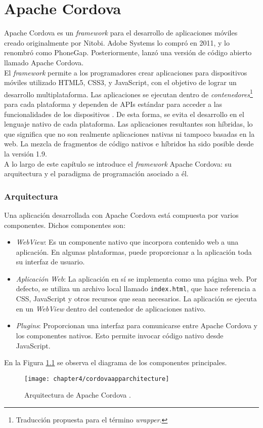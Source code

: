 \chapter{Apache Cordova}
Apache Cordova es un \emph{framework} para el desarrollo de aplicaciones móviles creado originalmente por Nitobi. Adobe Systems lo compró en 2011, y lo renombró como PhoneGap. Posteriormente, lanzó una versión de código abierto llamado Apache Cordova.\\

El \emph{framework} permite a los programadores crear aplicaciones para dispositivos móviles utilizado HTML5, CSS3, y JavaScript, con el objetivo de lograr un desarrollo multiplataforma. Las aplicaciones se ejecutan dentro de \emph{contenedores}\footnote{Traducción propuesta para el término \emph{wrapper}.} para cada plataforma y dependen de APIs estándar para acceder a las funcionalidades de los dispositivos \cite{ACO}. De esta forma, se evita el desarrollo en el lenguaje nativo de cada plataforma. Las aplicaciones resultantes son híbridas, lo que significa que no son realmente aplicaciones nativas ni tampoco basadas en la web. La mezcla de fragmentos de código nativos e híbridos ha sido posible desde la versión 1.9.\\

A lo largo de este capítulo se introduce el \emph{framework} Apache Cordova: su arquitectura y el paradigma de programación asociado a él.
\subsection{Arquitectura}
Una aplicación desarrollada con Apache Cordova está compuesta por varios componentes. Dichos componentes son:
\begin{itemize}
    \item \emph{WebView}: Es un componente nativo que incorpora contenido web a una aplicación. En algunas plataformas, puede proporcionar a la aplicación toda su interfaz de usuario.
    \item \emph{Aplicación Web}: La aplicación en sí se implementa como una página web. Por defecto, se utiliza un archivo local llamado \texttt{index.html}, que hace referencia a CSS, JavaScript y otros recursos que sean necesarios. La aplicación se ejecuta en un \textit{WebView} dentro del contenedor de aplicaciones nativo.
    \item \emph{Plugins}: Proporcionan una interfaz para comunicarse entre Apache Cordova y los componentes nativos. Esto permite invocar código nativo desde JavaScript.
\end{itemize}
En la Figura \ref{fig:ch05:cordova-arch} se observa el diagrama de los componentes principales.
\begin{figure}[hbtp]
	\begin{center}
		\texttt{[image: chapter4/cordovaapparchitecture]}
	    \caption{Arquitectura de Apache Cordova \cite{ACO}.}
	    \label{fig:ch05:cordova-arch}
    \end{center}
\end{figure}
